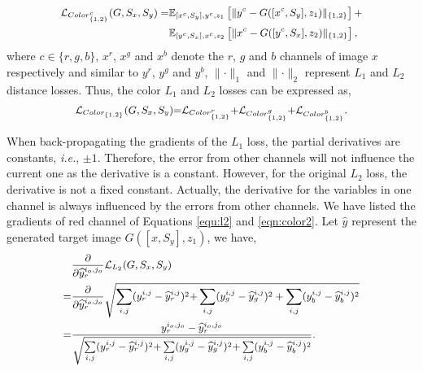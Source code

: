 \documentclass[sigconf]{acmart}
\begin{document}
\vspace{-0.3cm}
\begin{equation} \small
\begin{aligned}
\mathcal{L}_{Color^{c}_{\{1,2\}}}(G, S_x, S_y) = & 
\mathbb{E}_{[x^{c}, S_y], y^{c}, z_1} \left[ \lVert y^{c} - G([x^{c}, S_y], z_1) \lVert_{\{1,2\}} \right] + \\
& \mathbb{E}_{[y^{c}, S_x], x^{c}, z_2} \left[ \lVert x^{c} -	 G([y^{c}, S_x], z_2) \lVert_{\{1,2\}} \right],
\end{aligned}
\label{eqn:color_rgb}
\end{equation}
where $c{\in}\{r,g,b\}$, $x^r$, $x^g$ and $x^b$ denote the $r$, $g$ and $b$ channels of image $x$ respectively and similar to $y^r$, $y^g$ and $y^b$, $\lVert\cdotp \lVert_1$ and $\lVert\cdotp \lVert_2$ represent $L_1$ and $L_2$ distance losses.
Thus, the color $L_1$ and $L_2$ losses can be expressed as, 
\begin{equation}\small
\begin{aligned}
\mathcal{L}_{Color_{\{1,2\}}}(G, S_x, S_y) {=} \mathcal{L}_{Color^{r}_{\{1,2\}}} {+} \mathcal{L}_{Color^{g}_{\{1,2\}}} {+} \mathcal{L}_{Color^{b}_{\{1,2\}}}.
\end{aligned}
\label{eqn:color2}
\end{equation}

When back-propagating the gradients of the $L_1$ loss, the partial derivatives are constants, \emph{i.e.}, $\pm 1$. 
Therefore, the error from other channels will not influence the current one as the derivative is a constant.
However, for the original $L_2$ loss, the derivative is not a fixed constant. Actually, the derivative for the variables in one channel is always influenced by the errors from other channels. 
We have listed the gradients of red channel of Equations \ref{equ:l2} and \ref{eqn:color2}. Let $\widehat{y}$ represent the generated target image $G([x, S_y], z_1)$, we have,
\vspace{-0.2cm}
\begin{equation} \small
\begin{aligned}
& \frac{\partial}{\partial \widehat{y}_r^{i_o,j_o}} \mathcal{L}_{L_2}(G, S_x, S_y)  \\
= &  \frac{\partial}{\partial \widehat{y}_r^{i_o,j_o}} \sqrt{\sum_{i,j}(y_r^{i,j}-\widehat{y}_r^{i,j})^2 {+} \sum_{i,j}(y_g^{i,j}-\widehat{y}_g^{i,j})^2 + \sum_{i,j}(y_b^{i,j}-\widehat{y}_b^{i,j})^2} \\
= &  \frac{y_r^{i_o,j_o}-\widehat{y}_r^{i_o,j_o}}{\sqrt{\sum\limits_{i,j}(y_r^{i,j}-\widehat{y}_r^{i,j})^2 {+} \sum\limits_{i,j} (y_g^{i,j}-\widehat{y}_g^{i,j})^2 {+} \sum\limits_{i,j}(y_b^{i,j}-\widehat{y}_b^{i,j})^2}}. 
\end{aligned}
\label{eqn:gra_l2}
\end{equation}
\end{document}
